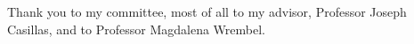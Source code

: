 Thank you to my committee, most of all to my advisor, Professor Joseph Casillas, and to Professor Magdalena Wrembel.